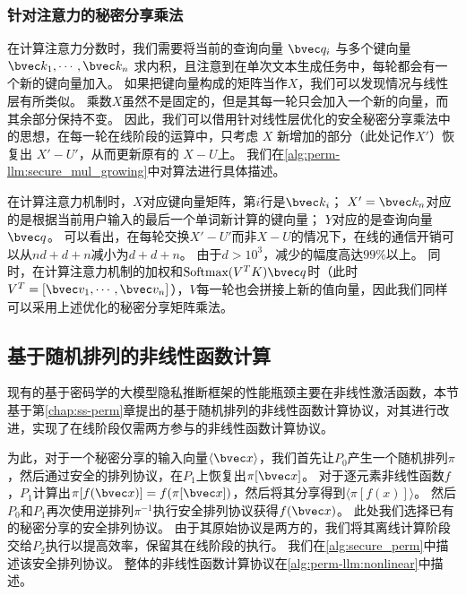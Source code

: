 \subsubsection{针对注意力的秘密分享乘法}
在计算注意力分数时，我们需要将当前的查询向量 $\bvec q_i$ 与多个键向量 $\bvec k_1, \cdots, \bvec k_n$ 求内积，且注意到在单次文本生成任务中，每轮都会有一个新的键向量加入。
%
如果把键向量构成的矩阵当作$X$，我们可以发现情况与线性层有所类似。
乘数$X$虽然不是固定的，但是其每一轮只会加入一个新的向量，而其余部分保持不变。
%
因此，我们可以借用针对线性层优化的安全秘密分享乘法中的思想，在每一轮在线阶段的运算中，只考虑 $X$ 新增加的部分（此处记作$X'$）恢复出 $X' - U'$，从而更新原有的 $X - U$上。
%
我们在\autoref{alg:perm-llm:secure_mul_growing}中对算法进行具体描述。



在计算注意力机制时，$X$对应键向量矩阵，第$i$行是$\bvec k_i$；
$X' = \bvec k_n$对应的是根据当前用户输入的最后一个单词新计算的键向量；
%
$Y$对应的是查询向量 $\bvec q$。
%
可以看出，在每轮交换$X' - U'$而非$X - U$的情况下，在线的通信开销可以从$nd + d + n$减小为$d + d + n$。
%
由于$d > 10^3$，减少的幅度高达$99\%$以上。
%
同时，在计算注意力机制的加权和$\text{Softmax}(V^TK) \bvec q$时（此时$V^T = [\bvec v_1, \cdots, \bvec v_n]$），$V$每一轮也会拼接上新的值向量，因此我们同样可以采用上述优化的秘密分享矩阵乘法。


\subsection{基于随机排列的非线性函数计算}
现有的基于密码学的大模型隐私推断框架的性能瓶颈主要在非线性激活函数，本节基于第\ref{chap:ss-perm}章提出的基于随机排列的非线性函数计算协议，对其进行改进，实现了在线阶段仅需两方参与的非线性函数计算协议。
%

为此，对于一个秘密分享的输入向量$\langle \bvec x \rangle$，我们首先让$P_0$产生一个随机排列$\pi$，然后通过安全的排列协议，在$P_1$上恢复出$\pi[\bvec x]$。
对于逐元素非线性函数$f$，$P_1$计算出$\pi[f(\bvec x)] = f(\pi[\bvec x])$，然后将其分享得到$\langle \pi[f(x)] \rangle$。
%
然后$P_0$和$P_1$再次使用逆排列$\pi^{-1}$执行安全排列协议获得$f(\bvec x)$。
%
此处我们选择已有的秘密分享的安全排列协议\cite{chase_2020_secret_shared_shuffle}。
由于其原始协议是两方的，我们将其离线计算阶段交给$P_2$执行以提高效率，保留其在线阶段的执行。
%
我们在\autoref{alg:secure_perm}中描述该安全排列协议。
整体的非线性函数计算协议在\autoref{alg:perm-llm:nonlinear}中描述。

